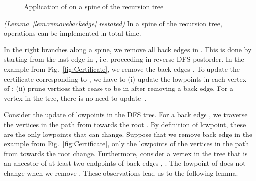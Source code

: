 \begin{figure*}[!t]
{
}

\caption{Application of  on a spine of the recursion tree}
\label{fig:oracleleftexample}
\end{figure*}
\begin{lemma}
	\emph{(Lemma~\ref{lem:removebackedge} restated)} In a spine of
	the recursion tree, operations  can be
	implemented in  total time.
\end{lemma}

	In the right branches along a spine, we remove all back edges
	in . This is done by starting from the last edge in
	, i.e. proceeding in reverse DFS postorder. In the
	example from Fig.~\ref{fig:Certificate}, we remove the back
	edges . To update the certificate
	corresponding to , we have to (i) update the
	lowpoints in each vertex of ; (ii) prune vertices that
	cease to be in  after removing a back edge. For a
	vertex  in the tree, there is no need to update~.

	Consider the update of lowpoints in the DFS tree.  For
	a back edge , we traverse the vertices in the
	path from  towards the root . By definition of
	lowpoint, these are the only lowpoints that can change.
	Suppose that we remove back edge  in the example from
	Fig.~\ref{fig:Certificate}, only the lowpoints of the vertices
	in the path from  towards the root  change.
	Furthermore, consider a vertex  in the tree that is an
	ancestor of at least two endpoints  of back edges
	, . The lowpoint of  does not change when we
	remove .  These observations lead us to the following
	lemma.

